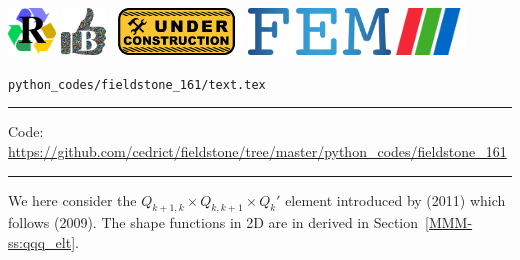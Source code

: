 \noindent
\includegraphics[height=1.25cm]{images/pictograms/replication}
\includegraphics[height=1.25cm]{images/pictograms/benchmark}
\includegraphics[height=1.25cm]{images/pictograms/under_construction}
\includegraphics[height=1.25cm]{images/pictograms/FEM}
\includegraphics[height=1.25cm]{images/pictograms/paraview}


\begin{flushright} {\tiny {\color{gray} \tt python\_codes/fieldstone\_161/text.tex}} \end{flushright}

%

\par\noindent\rule{\textwidth}{0.4pt}

\begin{center}
\inpython
{\small Code: \url{https://github.com/cedrict/fieldstone/tree/master/python_codes/fieldstone_161}}
\end{center}

\par\noindent\rule{\textwidth}{0.4pt}


We here consider the $Q_{k+1,k}\times Q_{k,k+1} \times Q_{k}'$ element introduced 
by \textcite{huzh11} (2011) which follows \textcite{zhan09} (2009).
The shape functions in 2D are in derived in Section~\ref{MMM-ss:qqq_elt}.

